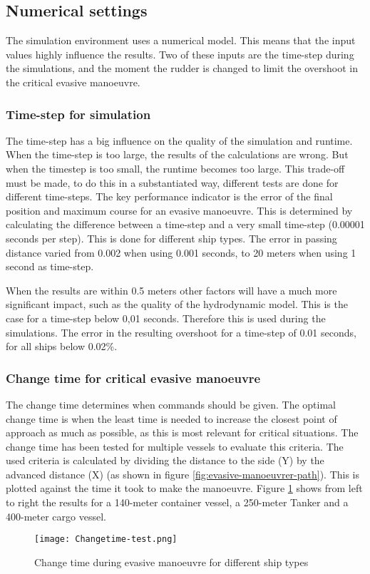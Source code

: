\subsection{Numerical settings}
The simulation environment uses a numerical model. This means that the input values highly influence the results. Two of these inputs are the time-step during the simulations, and the moment the rudder is changed to limit the overshoot in the critical evasive manoeuvre.

\subsubsection{Time-step for simulation}
The time-step has a big influence on the quality of the simulation and runtime. When the time-step is too large, the results of the calculations are wrong. But when the timestep is too small, the runtime becomes too large. This trade-off must be made, to do this in a substantiated way, different tests are done for different time-steps. 
The key performance indicator is the error of the final position and maximum course for an evasive manoeuvre. This is determined by calculating the difference between a time-step and a very small time-step (0.00001 seconds per step). This is done for different ship types. The error in passing distance varied from 0.002 when using 0.001 seconds, to 20 meters when using 1 second as time-step. 

\newpage
When the results are within 0.5 meters other factors will have a much more significant impact, such as the quality of the hydrodynamic model. This is the case for a time-step below 0,01 seconds. Therefore this is used during the simulations. The error in the resulting overshoot for a time-step of 0.01 seconds, for all ships below 0.02\%. 

\subsubsection{Change time for critical evasive manoeuvre}
\label{apps:change-time}
The change time determines when commands should be given. The optimal change time is when the least time is needed to increase the closest point of approach as much as possible, as this is most relevant for critical situations.
The change time has been tested for multiple vessels to evaluate this criteria. The used criteria is calculated by dividing the distance to the side (Y) by the advanced distance (X) (as shown in figure \ref{fig:evasive-manoeuvrer-path}). This is plotted against the time it took to make the manoeuvre. Figure \ref{fig:change-time} shows from left to right the results for a 140-meter container vessel, a 250-meter Tanker and a 400-meter cargo vessel.
\begin{figure}[p]
	\centering
	\texttt{[image: Changetime-test.png]}
	\caption{Change time during evasive manoeuvre for different ship types}
	\label{fig:change-time} 
\end{figure}


